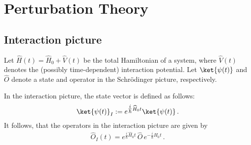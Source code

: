 \chapter{Perturbation Theory}

    \minitoc

\section{Interaction picture}\label{section:interaction_picture}

    Let $\widehat{H}(t)=\widehat{H}_0+\widehat{V}(t)$ be the total Hamiltonian of a system, where $\widehat{V}(t)$ denotes the (possibly time-dependent) interaction potential. Let $\ket{\psi(t)}$ and $\widehat{O}$ denote a state and operator in the Schr\"odinger picture, respectively.

    \begin{definition}
        In the interaction picture, the state vector is defined as follows:
        \begin{gather}
            \ket{\psi(t)}_I := e^{\tfrac{i}{\hbar}\widehat{H}_0t}\ket{\psi(t)}\,.
        \end{gather}
        It follows, that the operators in the interaction picture are given by
        \begin{gather}
            \widehat{O}_I(t) = e^{\tfrac{i}{\hbar}\widehat{H}_0t}\,\widehat{O}\,e^{-\tfrac{i}{\hbar}\widehat{H}_0t}\,.
        \end{gather}
    \end{definition}

